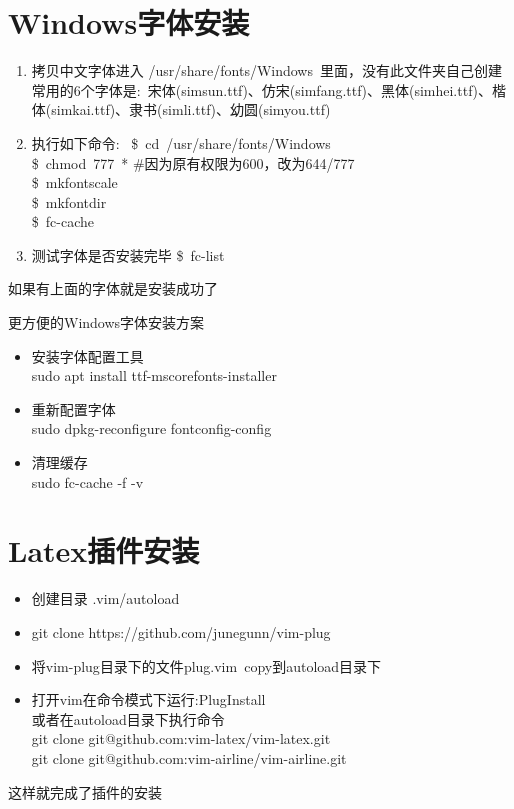 \documentclass[10pt, oneside, a4paper]{article}      %
\begin{document}
\section{Windows字体安装}
\begin{enumerate}
	\item 拷贝中文字体进入 \textrm{/usr/share/fonts/Windows}~里面，没有此文件夹自己创建\\
		常用的6个字体是:~宋体(\textrm{simsun.ttf})、仿宋(\textrm{simfang.ttf})、黑体(\textrm{simhei.ttf})、楷体(\textrm{simkai.ttf})、隶书(\textrm{simli.ttf})、幼圆(\textrm{simyou.ttf})
	\item 执行如下命令:~
\$~\textrm{cd~/usr/share/fonts/Windows}\\
\$~\textrm{chmod~777~*} \#因为原有权限为600，改为644/777\\
\$~\textrm{mkfontscale}\\
\$~\textrm{mkfontdir}\\
\$~\textrm{fc-cache}
\item 测试字体是否安装完毕
	\$~\textrm{fc-list}
\end{enumerate}
如果有上面的字体就是安装成功了

更方便的\textrm{Windows}字体安装方案
\begin{itemize}
	\item 安装字体配置工具\\
		sudo apt install ttf-mscorefonts-installer
	\item 重新配置字体\\
		sudo dpkg-reconfigure fontconfig-config
	\item 清理缓存\\
		sudo fc-cache -f -v
\end{itemize}

\section{\rm{Latex}插件安装}
\begin{itemize}
	\item 创建目录 .vim/autoload
	\item git clone https://github.com/junegunn/vim-plug
	\item 将\textrm{vim-plug}目录下的文件\textrm{plug.vim}~\textrm{copy}到\textrm{autoload}目录下
	\item 打开\textrm{vim}在命令模式下运行\textrm{:PlugInstall}\\
		或者在\textrm{autoload}目录下执行命令\\
git clone git@github.com:vim-latex/vim-latex.git\\
git clone git@github.com:vim-airline/vim-airline.git
\end{itemize}
这样就完成了插件的安装
\end{document}
